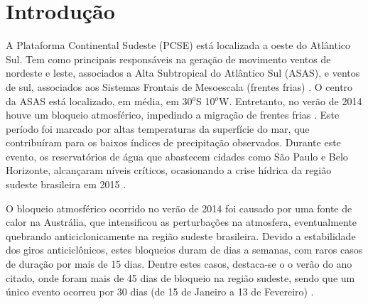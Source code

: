 
\newpage
\section{Introdução} %
\label{sec:introducao}


\hspace{6mm} A Plataforma Continental Sudeste (PCSE) está localizada a oeste do Atlântico Sul. 
Tem como principais responsáveis na geração de movimento ventos de nordeste e leste, associados a 
Alta Subtropical do Atlântico Sul (ASAS), e ventos de sul, associados aos Sistemas Frontais
de Mesoescala (frentes frias) . O centro da ASAS está localizado, em
média, em 30$^o$S 10$^o$W. Entretanto, no verão de 2014 houve um bloqueio atmosférico, impedindo 
a migração de frentes frias . Este período foi marcado por altas temperaturas da superfície do mar, 
que contribuíram para os baixos índices de precipitação observados. Durante este evento, os reservatórios 
de água que abastecem cidades como São Paulo e Belo Horizonte, alcançaram níveis críticos, 
ocasionando a crise hídrica da região sudeste brasileira em 2015 .

\hspace{6mm} O bloqueio atmosférico ocorrido no verão de 2014 foi causado por uma 
fonte de calor na Austrália, que intensificou as perturbações na atmosfera, eventualmente
quebrando anticiclonicamente na região sudeste brasileira. Devido a estabilidade dos giros
anticiclônicos, estes bloqueios duram de dias a semanas, com raros casos de 
duração por mais de 15 dias. Dentre estes casos, destaca-se o o verão do ano citado,
onde foram mais de 45 dias de bloqueio na região sudeste, sendo que um único 
evento ocorreu por 30 dias (de 15 de Janeiro a 13 de Fevereiro) .

